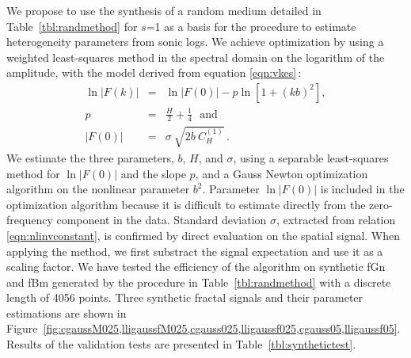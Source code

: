 We propose to use the synthesis of a random medium 
detailed in Table~\ref{tbl:randmethod} for $s$=1
as a basis for the procedure to estimate heterogeneity parameters from sonic logs.
We achieve optimization by using a weighted least-squares method in the spectral domain
on the logarithm of the amplitude, with the model derived from equation \ref{eqn:vkes}\,:
\begin{eqnarray}
\ln|F(k)| & = & \ln|F(0)| - p\ln\left[1+(kb)^2\right],\label{eqn:nlinvmethod} \\
p & = & \frac{H}{2}+\frac{1}{4}\ \ \ \mbox{and} \\
|F(0)| & = & \sigma~\sqrt{2b~C^{(1)}_{H}}\,. \label{eqn:nlinvconstant}
\end{eqnarray}
We estimate the three parameters, $b$, $H$, and $\sigma$, using a separable least-squares method 
\cite[]{Golub_P73} for $\ln|F(0)|$ and the slope $p$, and a Gauss Newton optimization algorithm on the nonlinear parameter $b^2$.
Parameter $\ln|F(0)|$ is included in the optimization algorithm
because it is difficult to estimate directly from the zero-frequency component in the data.
Standard deviation $\sigma$, extracted from relation \ref{eqn:nlinvconstant}, is confirmed by direct evaluation on the spatial signal.
When applying the method, we first substract the signal expectation and use it as a scaling factor.
We have tested the efficiency of the algorithm on synthetic fGn and fBm 
generated by the procedure in Table~\ref{tbl:randmethod} with a discrete length of 4056 points.
Three synthetic fractal signals and their parameter estimations are shown 
in Figure~\ref{fig:cgaussM025,lligaussfM025,cgauss025,lligaussf025,cgauss05,lligaussf05}.
Results of the validation tests are presented in Table~\ref{tbl:synthetictest}.

